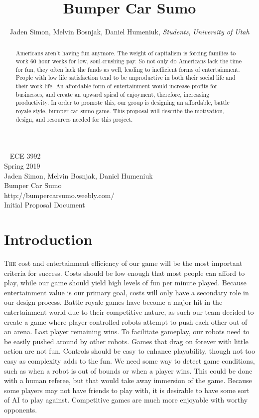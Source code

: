 \documentclass[11pt]{ieeeconf}
\title{Bumper Car Sumo}
\author{Jaden Simon, Melvin Bosnjak, Daniel Humeniuk,
 \textit{Students}, \textit{University of Utah}}
\begin{document}
\begin{titlepage}
  \centering
  \
  \vfil
  \Large ECE 3992\\
  \Large Spring 2019\\  
  \Large Jaden Simon, Melvin Bosnjak, Daniel Humeniuk\\  
  \Large Bumper Car Sumo\\
  \Large http://bumpercarsumo.weebly.com/\\
  \Large Initial Proposal Document\\
  \vfil
\end{titlepage}


\maketitle
\begin{abstract}
Americans aren’t having fun anymore. The weight of capitalism is forcing families to work 60 hour weeks for low, soul-crushing pay. So not only do Americans lack the time for fun, they often lack the funds as well, leading to inefficient forms of entertainment. People with low life satisfaction tend to be unproductive in both their social life and their work life. An affordable form of entertainment would increase profits for businesses, and create an upward spiral of enjoyment, therefore, increasing productivity. In order to promote this, our group is designing an affordable, battle royale style, bumper car sumo game. This proposal will describe the motivation, design, and resources needed for this project.
\end{abstract}

\section{Introduction}
\lettrine{T}{he} cost and entertainment efficiency of our game will be the most important criteria for success. Costs should be low enough that most people can afford to play, while our game should yield high levels of fun per minute played. Because entertainment value is our primary goal, costs will only have a secondary role in our design process. Battle royale games have become a major hit in the entertainment world due to their competitive nature, as such our team decided to create a game where player-controlled robots attempt to push each other out of an arena. Last player remaining wins. To facilitate gameplay, our robots need to be easily pushed around by other robots. Games that drag on forever with little action are not fun. Controls should be easy to enhance playability, though not too easy as complexity adds to the fun. We need some way to detect game conditions, such as when a robot is out of bounds or when a player wins. This could be done with a human referee, but that would take away immersion of the game. Because some players may not have friends to play with, it is desirable to have some sort of AI to play against. Competitive games are much more enjoyable with worthy opponents.
\end{document}
